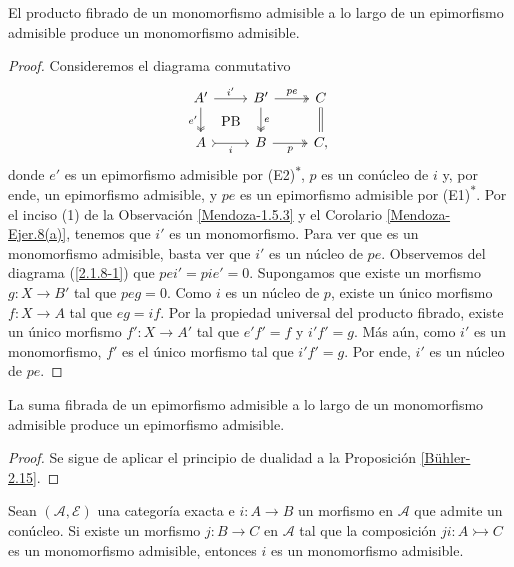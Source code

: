 \documentclass[tesis]{subfiles}
\begin{document}
\begin{Prop}\label{Bühler-2.15}
    El producto fibrado de un monomorfismo admisible a lo largo de un epimorfismo admisible produce un monomorfismo admisible. 
\end{Prop}

\begin{proof}

    Consideremos el diagrama conmutativo
    \begin{equation}\label{2.1.8-1}
        \begin{tikzcd}
            A' \arrow[phantom]{dr}[]{\text{PB}} \arrow[two heads]{d}[swap]{e'} \arrow[]{r}[]{i'} &B' \arrow[two heads]{d}[]{e} \arrow[two heads]{r}[]{pe} &C \arrow[equals]{d}[]{} \\
            A \arrow[tail]{r}[swap]{i} &B \arrow[two heads]{r}[swap]{p} &C,
        \end{tikzcd}
    \end{equation}
    donde $e'$ es un epimorfismo admisible por (E2)\textsuperscript{$\ast$}, $p$ es un conúcleo de $i$ y, por ende, un epimorfismo admisible, y $pe$ es un epimorfismo admisible por (E1)\textsuperscript{$\ast$}. Por el inciso (1) de la Observación \ref{Mendoza-1.5.3} y el Corolario \ref{Mendoza-Ejer.8(a)}, tenemos que $i'$ es un monomorfismo. Para ver que es un monomorfismo admisible, basta ver que $i'$ es un núcleo de $pe$. Observemos del diagrama (\ref{2.1.8-1}) que $pei'=pie'=0$. Supongamos que existe un morfismo $g:X\to B'$ tal que $peg=0$. Como $i$ es un núcleo de $p$, existe un único morfismo $f:X\to A$ tal que $eg=if$. Por la propiedad universal del producto fibrado, existe un único morfismo $f':X\to A'$ tal que $e'f'=f$ y $i'f'=g$. Más aún, como $i'$ es un monomorfismo, $f'$ es el único morfismo tal que $i'f'=g$. Por ende, $i'$ es un núcleo de $pe$.
\end{proof}

\begin{Prop}\label{Bühler-2.15*}
    La suma fibrada de un epimorfismo admisible a lo largo de un monomorfismo admisible produce un epimorfismo admisible.
\end{Prop}

\begin{proof}
    Se sigue de aplicar el principio de dualidad a la Proposición \ref{Bühler-2.15}.
\end{proof}

\begin{Prop}\label{Bühler-2.16}
    Sean $(\mathscr{A},\mathscr{E})$ una categoría exacta e $i:A\to B$ un morfismo en $\mathscr{A}$ que admite un conúcleo. Si existe un morfismo $j:B\to C$ en $\mathscr{A}$ tal que la composición $ji:A\rightarrowtail C$ es un monomorfismo admisible, entonces $i$ es un monomorfismo admisible.
\end{Prop}
\end{document}
